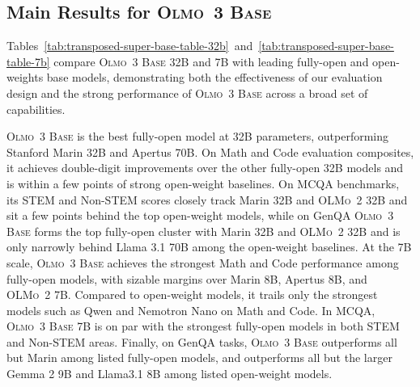 \documentclass[table]{ai2style/ai2}
\newcommand{\oldOlmo}{OLMo\xspace}
\newcommand{\newOlmo}{Olmo\xspace}
\newcommand{\olmotoo}{\textsc{\oldOlmo~2}\xspace}
\newcommand{\olmothreebase}{\textsc{\newOlmo~3 Base}\xspace}
\begin{document}
\subsection{Main Results for \olmothreebase}
\label{sec:pretrain_eval}
Tables~\ref{tab:transposed-super-base-table-32b}~and~\ref{tab:transposed-super-base-table-7b} compare \olmothreebase 32B and 7B with leading fully-open and open-weights base models, demonstrating both the effectiveness of our evaluation design and the strong performance of \olmothreebase across a broad set of capabilities.

\olmothreebase is the best fully-open model at 32B parameters, outperforming Stanford Marin 32B and Apertus 70B.
On Math and Code evaluation composites, it achieves double-digit improvements over the other fully-open 32B models and is within a few points of strong open-weight baselines.
On MCQA benchmarks, its STEM and Non-STEM scores closely track Marin 32B and \olmotoo 32B and sit a few points behind the top open-weight models, while on GenQA \olmothreebase forms the top fully-open cluster with Marin 32B and \olmotoo 32B and is only narrowly behind Llama 3.1 70B among the open-weight baselines.
At the 7B scale, \olmothreebase achieves the strongest Math and Code performance among fully-open models, with sizable margins over Marin 8B, Apertus 8B, and \olmotoo 7B.
Compared to open-weight models, it trails only the strongest models such as Qwen and Nemotron Nano on Math and Code.
In MCQA, \olmothreebase 7B is on par with the strongest fully-open models in both STEM and Non-STEM areas.
Finally, on GenQA tasks, \olmothreebase outperforms all but Marin among listed fully-open models, and outperforms all but the larger Gemma 2 9B and Llama3.1 8B among listed open-weight models.
\end{document}
